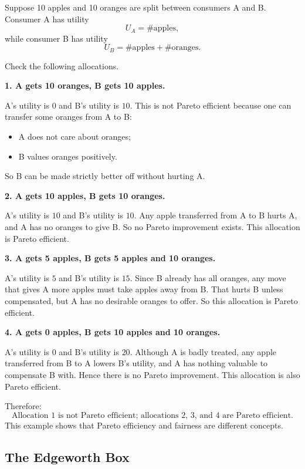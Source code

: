 \begin{examplebox}[title={Worked Example: checking Pareto efficiency}]
Suppose 10 apples and 10 oranges are split between consumers A and B.
Consumer A has utility
\[
U_A = \#\text{apples},
\]
while consumer B has utility
\[
U_B = \#\text{apples} + \#\text{oranges}.
\]

Check the following allocations.

\textbf{1. A gets 10 oranges, B gets 10 apples.}

A's utility is $0$ and B's utility is $10$. This is not Pareto efficient because one can transfer some oranges from A to B:
\begin{itemize}
    \item A does not care about oranges;
    \item B values oranges positively.
\end{itemize}
So B can be made strictly better off without hurting A.

\textbf{2. A gets 10 apples, B gets 10 oranges.}

A's utility is $10$ and B's utility is $10$. Any apple transferred from A to B hurts A, and A has no oranges to give B. So no Pareto improvement exists. This allocation is Pareto efficient.

\textbf{3. A gets 5 apples, B gets 5 apples and 10 oranges.}

A's utility is $5$ and B's utility is $15$. Since B already has all oranges, any move that gives A more apples must take apples away from B. That hurts B unless compensated, but A has no desirable oranges to offer. So this allocation is Pareto efficient.

\textbf{4. A gets 0 apples, B gets 10 apples and 10 oranges.}

A's utility is $0$ and B's utility is $20$. Although A is badly treated, any apple transferred from B to A lowers B's utility, and A has nothing valuable to compensate B with. Hence there is no Pareto improvement. This allocation is also Pareto efficient.

Therefore:
\[
\boxed{\text{Allocation 1 is not Pareto efficient; allocations 2, 3, and 4 are Pareto efficient.}}
\]
This example shows that Pareto efficiency and fairness are different concepts.
\end{examplebox}

\subsection{The Edgeworth Box}

